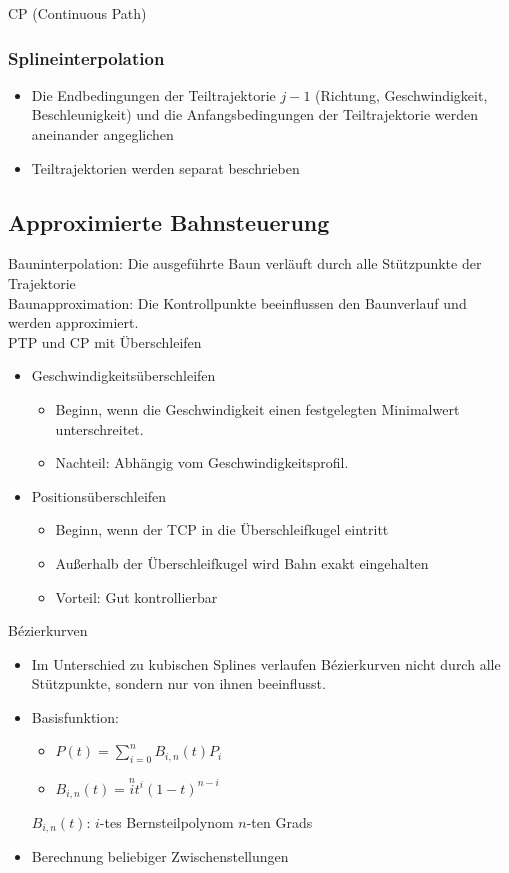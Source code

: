 \documentclass[paper=a4, fontsize=11pt]{scrartcl} %
\numberwithin{equation}{section} %
\numberwithin{figure}{section} %
\numberwithin{table}{section} %
\begin{document}
CP (Continuous Path)

\subsubsection{Splineinterpolation}

\begin{itemize}
\item Die Endbedingungen der Teiltrajektorie $j-1$ (Richtung, Geschwindigkeit, Beschleunigkeit) und die Anfangsbedingungen der Teiltrajektorie werden aneinander angeglichen
\item Teiltrajektorien werden separat beschrieben
\end{itemize}

\subsection{Approximierte Bahnsteuerung}

Bauninterpolation: Die ausgeführte Baun verläuft durch alle Stützpunkte der Trajektorie\\
Baunapproximation: Die Kontrollpunkte beeinflussen den Baunverlauf und werden approximiert.\\

PTP und CP mit Überschleifen
\begin{itemize}
\item Geschwindigkeitsüberschleifen
\begin{itemize}
\item Beginn, wenn die Geschwindigkeit einen festgelegten Minimalwert unterschreitet.
\item Nachteil: Abhängig vom Geschwindigkeitsprofil.
\end{itemize}
\item Positionsüberschleifen
\begin{itemize}
\item Beginn, wenn der TCP in die Überschleifkugel eintritt
\item Außerhalb der Überschleifkugel wird Bahn exakt eingehalten
\item Vorteil: Gut kontrollierbar
\end{itemize}
\end{itemize}

Bézierkurven
\begin{itemize}
\item Im Unterschied zu kubischen Splines verlaufen Bézierkurven nicht durch alle Stützpunkte, sondern nur von ihnen beeinflusst.
\item Basisfunktion:
\begin{itemize}
\item $P(t) = \sum\limits_{i=0}^n B_{i,n}(t) P_i$
\item $B_{i,n}(t) = \overset{n}{i} t^i(1-t)^{n-i}$
\end{itemize}
$B_{i,n}(t)$: $i$-tes Bernsteilpolynom $n$-ten Grads
\item Berechnung beliebiger Zwischenstellungen
\end{itemize}
\end{document}

